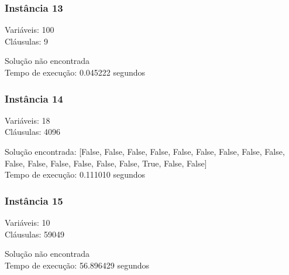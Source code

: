 \documentclass[12pt]{article}
\begin{document}
    \subsubsection{Instância 13}
        \begin{tcolorbox}[title=Entrada da instância 13, width=\linewidth, fontupper=\ttfamily,  halign=flush left]
            Variáveis: 100 \\
            Cláusulas: 9
        \end{tcolorbox}
        \begin{tcolorbox}[title=Saída da instância 13, width=\linewidth, fontupper=\ttfamily, halign=flush left]
            Solução não encontrada \\
            Tempo de execução: 0.045222 segundos
        \end{tcolorbox}
    \subsubsection{Instância 14}
        \begin{tcolorbox}[title=Entrada da instância 14, width=\linewidth, fontupper=\ttfamily,  halign=flush left]
            Variáveis: 18 \\
            Cláusulas: 4096
        \end{tcolorbox}
        \begin{tcolorbox}[title=Saída da instância 14, width=\linewidth, fontupper=\ttfamily, halign=flush left]
            Solução encontrada: [False, False, False, False, False, False, False, False, False, False, False, False, False, False, False, True, False, False] \\
            Tempo de execução: 0.111010 segundos
        \end{tcolorbox}
    \subsubsection{Instância 15}
        \begin{tcolorbox}[title=Entrada da instância 15, width=\linewidth, fontupper=\ttfamily,  halign=flush left]
            Variáveis: 10 \\
            Cláusulas: 59049
        \end{tcolorbox}
        \begin{tcolorbox}[title=Saída da instância 15, width=\linewidth, fontupper=\ttfamily, halign=flush left]
            Solução não encontrada \\
            Tempo de execução: 56.896429 segundos
        \end{tcolorbox}
\clearpage
\end{document}
